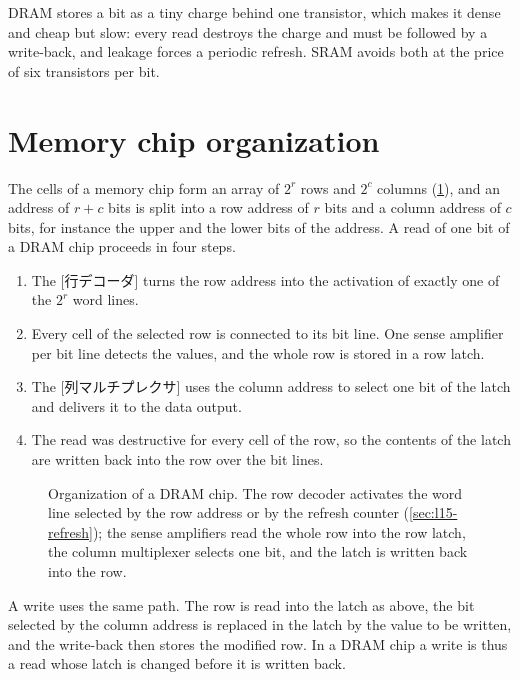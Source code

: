 \documentclass[../main.tex]{subfiles}
\begin{document}
\begin{keypoint}
  DRAM stores a bit as a tiny charge behind one transistor, which makes it
  dense and cheap but slow: every read destroys the charge and must be
  followed by a write-back, and leakage forces a periodic refresh.  SRAM
  avoids both at the price of six transistors per bit.
\end{keypoint}

\section{Memory chip organization}
\label{sec:l15-chip}

The cells of a memory chip form an array of $2^r$ rows and $2^c$ columns
(\cref{fig:l15-chip}), and an address of $r+c$ bits is split into a row
address of $r$ bits and a column address of $c$ bits, for instance the upper
and the lower bits of the address.  A
read of one bit of a DRAM chip proceeds in four steps.
\begin{enumerate}
  \item The [行デコーダ] turns the row address into the
    activation of exactly one of the $2^r$ word lines.
  \item Every cell of the selected row is connected to its bit line.  One sense
    amplifier per bit line detects the values, and the whole row is stored in
    a row latch.
  \item The [列マルチプレクサ] uses the column address
    to select one bit of the latch and delivers it to the data output.
  \item The read was destructive for every cell of the row, so the contents of
    the latch are written back into the row over the bit lines.
\end{enumerate}

\begin{figure}[htbp]
  \centering
  
  \caption{Organization of a DRAM chip.  The row decoder activates the word
    line selected by the row address or by the refresh counter
    (\cref{sec:l15-refresh}); the sense amplifiers read the whole row into the
    row latch, the column multiplexer selects one bit, and the latch is written
    back into the row.}
  \label{fig:l15-chip}
\end{figure}

A write uses the same path.  The row is read into the latch as above, the bit
selected by the column address is replaced in the latch by the value to be
written, and the write-back then stores the modified row.  In a DRAM chip a
write is thus a read whose latch is changed before it is written
back.
\end{document}
